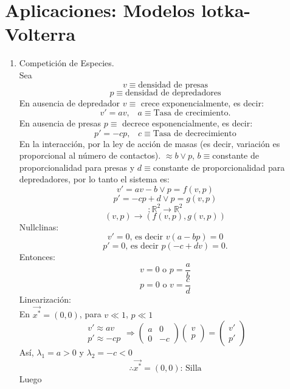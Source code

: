 \chapter{Aplicaciones: Modelos lotka-Volterra}

\begin{enumerate}
	\item Competición de Especies.\\
	      Sea
	      $$v\equiv\text{densidad de presas}$$
	      $$p\equiv\text{densidad de depredadores}$$
	      En ausencia de depredador $v\equiv$ crece exponencialmente, es decir:
	      $$v'=av\text{, }\text{ }a\equiv\text{Tasa de crecimiento}.$$
	      En ausencia de presas $p\equiv$ decrece esponencialmente, es decir:
	      $$p'=-cp\text{, }\text{ }c\equiv\text{Tasa de decrecimiento}$$
	      En la interacción, por la ley de acción de masas (es decir, variación es proporcional al número de contactos).
	      $\approx b\vee p$, $b\equiv$constante de proporcionalidad para presas y $d\equiv$constante de proporcionalidad
	      para depredadores, por lo tanto el sistema es:
	      $$v'=av-b\vee p=f(v,p)$$
	      $$p'=-cp+d\vee p=g(v,p)$$
	      $$:\mathbb{R}^2\to\mathbb{R}^2$$
	      $$(v,p)\to(f(v,p),g(v,p))$$
	      Nullclinas:
	      $$v'=0\text{, es decir }v(a-bp)=0$$
	      $$p'=0\text{, es decir }p(-c+dv)=0.$$
	      Entonces:
	      $$v=0\text{ o }p=\frac{a}{b}$$
	      $$p=0\text{ o }v=\frac{c}{d}$$
	      Linearización:\\
	      En $\vec{x^*}=(0,0)$, para $v\ll 1$, $p\ll 1$\\
	      \[
		      \begin{matrix}
			      v'\approx av \\
			      p'\approx -cp
		      \end{matrix}
		      \Longrightarrow
		      \begin{pmatrix}
			      a & 0  \\
			      0 & -c
		      \end{pmatrix}
		      \begin{pmatrix}
			      v \\
			      p
		      \end{pmatrix}
		      =
		      \begin{pmatrix}
			      v' \\
			      p'
		      \end{pmatrix}
	      \]
	      Así, $\lambda_1=a>0$ y $\lambda_2=-c<0$
	      $$\therefore\vec{x^*}=(0,0)\text{: Silla}$$
	      Luego
	      \[
		      \begin{matrix}

\end{matrix}\]
\end{enumerate}
